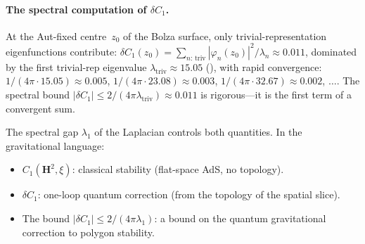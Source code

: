 \paragraph{The spectral computation of $\delta C_1$.}
At the Aut-fixed centre~$z_0$ of the Bolza surface,
only trivial-representation eigenfunctions contribute:
$\delta C_1(z_0) = \sum_{n:\,\text{triv}}
|\varphi_n(z_0)|^2 / \lambda_n \approx 0.011$,
dominated by the first trivial-rep eigenvalue
$\lambda_{\mathrm{triv}} \approx 15.05$
(\citealt{Strohmaier2013}), with rapid convergence:
$1/(4\pi \cdot 15.05) \approx 0.005$,
$1/(4\pi \cdot 23.08) \approx 0.003$,
$1/(4\pi \cdot 32.67) \approx 0.002$, $\ldots$.
The spectral bound $|\delta C_1| \le 2/(4\pi\lambda_{\mathrm{triv}})
\approx 0.011$ is rigorous---it is the first term of a
convergent sum.

The spectral gap $\lambda_1$ of the Laplacian controls
both quantities.
In the gravitational language:
\begin{itemize}
  \item $C_1(\mathbf{H}^2, \xi)$: classical stability
    (flat-space AdS, no topology).
  \item $\delta C_1$: one-loop quantum correction
    (from the topology of the spatial slice).
  \item The bound $|\delta C_1| \le 2/(4\pi\lambda_1)$:
    a bound on the quantum gravitational correction to
    polygon stability.
\end{itemize}


